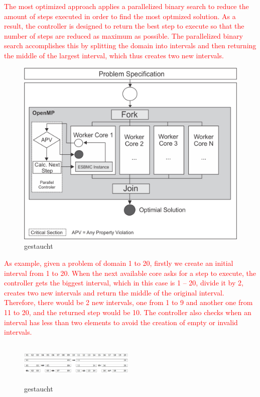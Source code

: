 \textcolor{Red}{The most optimized approach applies a parallelized binary search to reduce the amount of steps executed  in order to find the most optmized solution. As a result, the controller is designed to return the best step to execute so that the number of steps are reduced as maximum as possible. The parallelized binary search accomplishes this by splitting the domain into intervals and then returning the middle of the largest interval, which thus creates two new intervals.}
\begin{figure}[ht]
	\centering
  \includegraphics[scale=0.75]{Image/esbmc-parallel-Controler.png} 
	\caption{gestaucht}
	\label{fig2}
\end{figure}

\textcolor{Red}{As example, given a problem of domain 1 to 20, firstly we create an initial interval from 1 to 20. When the next available core asks for a step to execute, the controller gets the biggest interval, which in this case is 1 – 20, divide it by 2, creates two new intervals and return the middle of the original interval. Therefore, there would be 2 new intervals, one from 1 to 9 and another one from 11 to 20, and the returned step would be 10. The controller also checks when an interval has less than two elements to avoid the creation of empty or invalid intervals. }
\begin{figure}[ht]
	\centering
  \includegraphics[width=0.49\textwidth, height=75px]{Image/Fig4.png}
	\caption{gestaucht}
	\label{fig2}
\end{figure}

